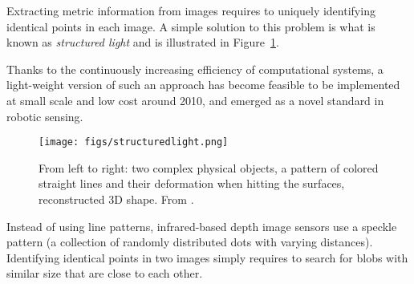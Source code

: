 

Extracting metric information from images requires to uniquely identifying identical points in each image. A simple solution to this problem is what is known as \textsl{structured light} and is illustrated in Figure~\ref{fig:struclight}.

Thanks to the continuously increasing efficiency of computational systems, a light-weight version of such an approach has become feasible to be implemented at small scale and low cost around 2010, and emerged as a novel standard in robotic sensing.

\begin{figure}
	\centering
		\texttt{[image: figs/structuredlight.png]}
	\caption{From left to right: two complex physical objects, a pattern of colored straight lines and their deformation when hitting the surfaces, reconstructed 3D shape. From \protect\cite{zhang2002rapid}.}
	\label{fig:struclight}
\end{figure}

Instead of using line patterns, infrared-based depth image sensors use a speckle pattern (a collection of randomly distributed dots with varying distances).%
Identifying identical points in two images simply requires to search for blobs with similar size that are close to each other.


